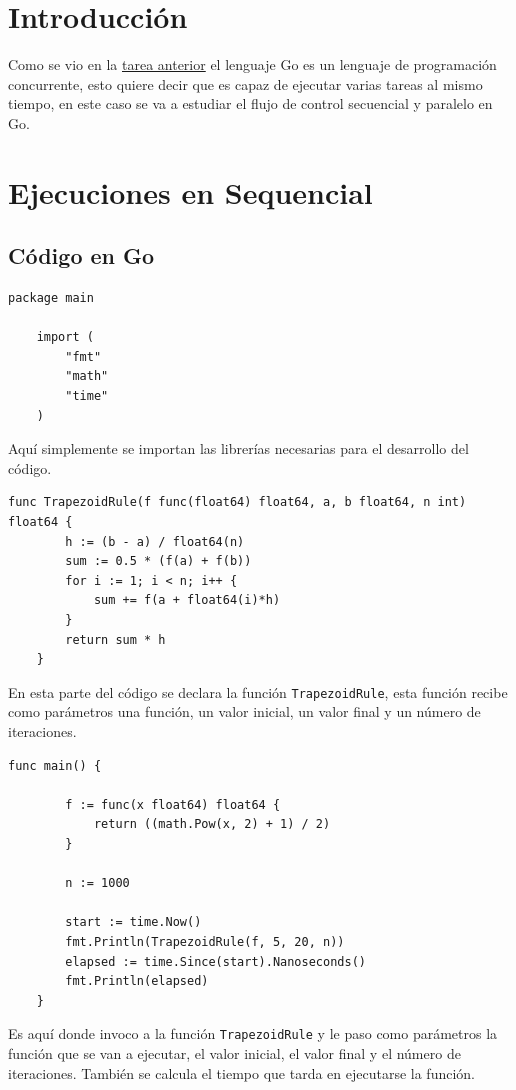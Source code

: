 \documentclass[a4paper]{article}
\begin{document}




\section{Introducción}

Como se vio en la \href{https://github.com/pintovillamar/computacion-distribuida-y-paralela/blob/main/tarea01-golang/build/report.pdf}{tarea anterior}
el lenguaje Go es un lenguaje de programación concurrente, esto quiere decir que es capaz de ejecutar varias tareas al mismo tiempo,
en este caso se va a estudiar el flujo de control secuencial y paralelo en Go.

\section{Ejecuciones en Sequencial}

\subsection{Código en Go}
\begin{lstlisting}[style=Golang]
    package main

    import (
        "fmt"
        "math"
        "time"
    )
\end{lstlisting}
Aquí simplemente se importan las librerías necesarias para el desarrollo del código.


\begin{lstlisting}[style=Golang, firstnumber=9]
    func TrapezoidRule(f func(float64) float64, a, b float64, n int) float64 {
        h := (b - a) / float64(n)
        sum := 0.5 * (f(a) + f(b))
        for i := 1; i < n; i++ {
            sum += f(a + float64(i)*h)
        }
        return sum * h
    }
\end{lstlisting}
En esta parte del código se declara la función \texttt{TrapezoidRule}, esta función recibe como parámetros una función, un valor inicial, un valor final y un número de iteraciones.
\\

\begin{lstlisting}[style=Golang, firstnumber=18]
    func main() {

        f := func(x float64) float64 {
            return ((math.Pow(x, 2) + 1) / 2)
        }

        n := 1000

        start := time.Now()
        fmt.Println(TrapezoidRule(f, 5, 20, n))
        elapsed := time.Since(start).Nanoseconds()
        fmt.Println(elapsed)
    }
\end{lstlisting}
Es aquí donde invoco a la función \texttt{TrapezoidRule} y le paso como parámetros la función que se van a ejecutar, el valor inicial, el valor final y el número de iteraciones.
También se calcula el tiempo que tarda en ejecutarse la función.
\end{document}
